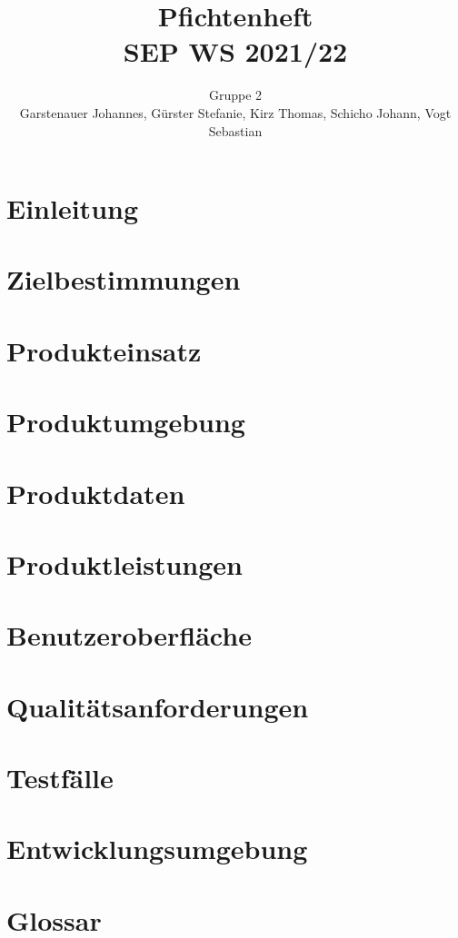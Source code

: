 \documentclass[a4paper,11pt,parskip=half-]{scrartcl}
\newcommand{\doubletitle}[2]{\title{#1 \\ [1ex] \normalsize #2}}
\newcommand{\extauthor}[2]{\author{#1 \\ \normalsize #2}}
\begin{document}
	\doubletitle{Pfichtenheft}{SEP WS 2021/22}
	
	\extauthor{Gruppe 2}{Garstenauer Johannes, Gürster Stefanie, Kirz Thomas, Schicho Johann, Vogt Sebastian}
	
	
	\maketitle
	\tableofcontents
	\listoftodos
	
	
	\newpage
	
	\section{Einleitung}
	
	
	\section{Zielbestimmungen}
	
	
	\section{Produkteinsatz}
	
	
	\section{Produktumgebung}
	
	
	\section{Produktdaten}
	
	
	\section{Produktleistungen}
	
	
	\section{Benutzeroberfläche}
	
	
	\section{Qualitätsanforderungen}
	
	
	\section{Testfälle}
	
	
	\section{Entwicklungsumgebung}
	
	
	\section{Glossar}
	
	
	
\end{document}
